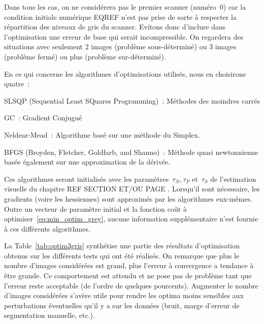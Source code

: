 \documentclass[main.tex]{subfiles}
\begin{document}
Dans tous les cas, on ne considérera pas le premier scanner (numéro~0) car la condition initiale numérique EQREF  n'est pas prise de sorte à respecter la répartition des niveaux de gris du scanner. Evitons donc d'inclure dans l'optimisation une erreur de base qui serait incompressible. On regardera des situations avec seulement 2 images (problème sous-déterminé) ou 3 images (problème fermé) ou plus (problème sur-déterminé).

En ce qui concerne les algorithmes d'optimisations utilisés, nous en choisirons quatre~:
\begin{myitemize}
\item SLSQP (Sequential Least SQuares Programming)~: Méthodes des moindres carrés 
\item GC~: Gradient Conjugué
\item Neldear-Mead~: Algorithme basé sur une méthode du Simplex.
\item BFGS (Broyden, Fletcher, Goldfarb, and Shanno)~: Méthode quasi newtonnienne basée  également sur une approximation de la dérivée.
\end{myitemize}
Ces algorithmes seront initialisés avec les paramètres~$\tau_N, \tau_P$ et~$\tau_S$ de l'estimation visuelle du chapitre REF SECTION ET/OU PAGE . Lorsqu'il sont nécessaire, les gradients (voire les hessiennes) sont approximés par les algorithmes eux-mêmes. Outre un vecteur de paramètre initial et la fonction coût à optimiser~\eqref{eq:min_optim_grey}, aucune information supplémentaire n'est fournie à ces différents algorithmes.




La Table~\ref{tab:optim3gris} synthétise une partie des résultats d'optimisation obtenus sur les différents tests qui ont été réalisés. 
On remarque que plus le nombre d'images considérées est grand, plus l'erreur à convergence a tendance à être grande. Ce comportement est attendu et ne pose pas de problème tant que l'erreur reste acceptable (de l'ordre de quelques pourcents). Augmenter le nombre d'images considérées s'avère utile pour rendre les optima moins sensibles aux perturbations éventuelles qu'il y a sur les données (bruit, marge d'erreur de segmentation manuelle, etc.).
\end{document}

